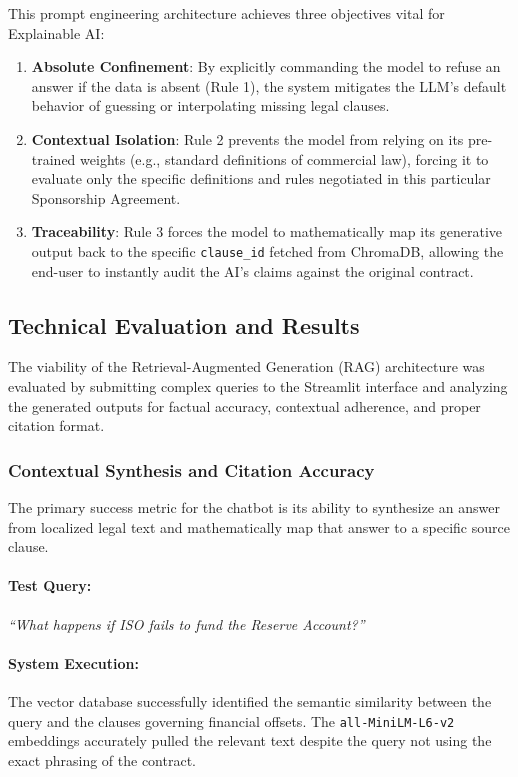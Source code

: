 \documentclass[twoside,final]{hcmut-report}
\begin{document}
This prompt engineering architecture achieves three objectives vital for Explainable AI:
\begin{enumerate}
  \item \textbf{Absolute Confinement}: By explicitly commanding the model to refuse an answer if the data is absent (Rule 1), the system mitigates the LLM's default behavior of guessing or interpolating missing legal clauses.
  \item \textbf{Contextual Isolation}: Rule 2 prevents the model from relying on its pre-trained weights (e.g., standard definitions of commercial law), forcing it to evaluate only the specific definitions and rules negotiated in this particular Sponsorship Agreement.
  \item \textbf{Traceability}: Rule 3 forces the model to mathematically map its generative output back to the specific \texttt{clause\_id} fetched from ChromaDB, allowing the end-user to instantly audit the AI's claims against the original contract.
\end{enumerate}

\subsection{Technical Evaluation and Results}
The viability of the Retrieval-Augmented Generation (RAG) architecture was evaluated by submitting complex queries to the Streamlit interface and analyzing the generated outputs for factual accuracy, contextual adherence, and proper citation format.

\subsubsection{Contextual Synthesis and Citation Accuracy}

The primary success metric for the chatbot is its ability to synthesize an answer from localized legal text and mathematically map that answer to a specific source clause.
\paragraph{Test Query:} \emph{``What happens if ISO fails to fund the Reserve Account?''}

\paragraph{System Execution:} The vector database successfully identified the semantic similarity between the query and the clauses governing financial offsets. The \texttt{all-MiniLM-L6-v2} embeddings accurately pulled the relevant text despite the query not using the exact phrasing of the contract.
\end{document}
